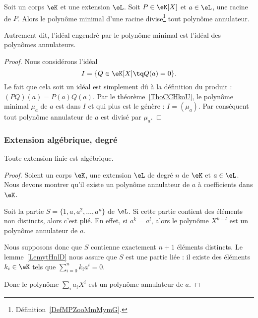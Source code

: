 \begin{proposition}\label{PropXULooPCusvE}
    Soit un corps \( \eK\) et une extension \( \eL\). Soit \( P\in \eK[X]\) et  \( a\in \eL\), une racine de \( P\). Alors le polynôme minimal d'une racine divise\footnote{Définition~\ref{DefMPZooMmMymG}.} tout polynôme annulateur.

    Autrement dit, l'idéal engendré par le polynôme minimal est l'idéal des polynômes annulateurs.
\end{proposition}

\begin{proof}
    Nous considérons l'idéal
    \begin{equation}
        I=\{ Q\in \eK[X]\tq Q(a)=0 \}.
    \end{equation}
    Le fait que cela soit un idéal est simplement dû à la définition du produit : \( (PQ)(a)=P(a)Q(a)\). Par le théorème~\ref{ThoCCHkoU}, le polynôme minimal \( \mu_a\) de \( a\) est dans \( I\) et qui plus est le génère : \( I=(\mu_a)\). Par conséquent tout polynôme annulateur de \( a\) est divisé par \( \mu_a\).
\end{proof}

\subsubsection{Extension algébrique, degré}

\begin{proposition}
    Toute extension finie est algébrique.
\end{proposition}

\begin{proof}
    Soient un corps \( \eK\), une extension \( \eL\) de degré \( n\) de \( \eK\) et \( a\in \eL\). Nous devons montrer qu'il existe un polynôme annulateur de \( a\) à coefficients dans \( \eK\).

    Soit la partie \( S=\{1,a,a^2,\ldots, a^n\}\) de \( \eL\). Si cette partie contient des éléments non distincts, alors c'est plié. En effet, si \( a^k=a^l\), alors le polynôme \( X^{k-l}\) est un polynôme annulateur de \( a\).

    Nous supposons donc que \( S\) contienne exactement \( n+1\) éléments distincts. Le lemme~\ref{LemytHnlD} nous assure que \( S\) est une partie liée : il existe des éléments \( k_i\in \eK\) tels que \( \sum_{i=0}^nk_ia^i=0\).

    Donc le polynôme \( \sum_ia_iX^i\) est un polynôme annulateur de \( a\).
\end{proof}

